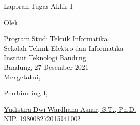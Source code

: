 \clearpage
\pagestyle{empty}

\begin{center}
    \smallskip

    \Large \bfseries \MakeUppercase{\thetitle}
    \vfill

    \Large Laporan Tugas Akhir I
    \vfill

    \large Oleh

    \Large \theauthor

    \large Program Studi Teknik Informatika \\

    \normalsize \normalfont
    Sekolah Teknik Elektro dan Informatika \\
    Institut Teknologi Bandung \\

    \vfill
    \normalsize \normalfont
    Bandung, 27 Desember 2021 \\
    Mengetahui,

    \vspace{0.5cm}
    Pembimbing I,

    \vfill
    \underline{Yudistira Dwi Wardhana Asnar, S.T., Ph.D.} \\
    NIP. 198008272015041002

\end{center}
\clearpage
